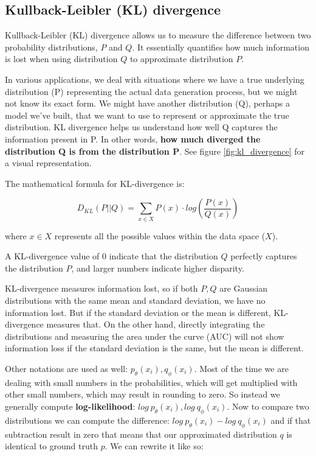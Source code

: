 \subsection{Kullback-Leibler (KL) divergence}
\label{appendix:kl_divergence}



Kullback-Leibler (KL) divergence allows us to measure the difference between two probability distributions, $P$ and $Q$. It essentially quantifies how much information is lost when using distribution $Q$ to approximate distribution $P$.

In various applications, we deal with situations where we have a true underlying distribution (P) representing the actual data generation process, but we might not know its exact form. We might have another distribution (Q), perhaps a model we've built, that we want to use to represent or approximate the true distribution. KL divergence helps us understand how well Q captures the information present in P. In other words, \textbf{how much diverged the distribution Q is from the distribution P}. See figure \ref{fig:kl_divergence} for a visual representation.

The mathematical formula for KL-divergence is:

\begin{equation}
\label{eq:kl-divergence}
    D_{KL}(P || Q) = \sum_{x \in X} P(x) \cdot log(\frac{P(x)}{Q(x)})
\end{equation}

where $x \in X$ represents all the possible values within the data space ($X$).

A KL-divergence value of 0 indicate that the distribution $Q$ perfectly captures the distribution $P$, and larger numbers indicate higher disparity.

KL-divergence measures information lost, so if both $P,Q$ are Gaussian distributions with the same mean and standard deviation, we have no information lost. But if the standard deviation or the mean is different, KL-divergence measures that. On the other hand, directly integrating the distributions and measuring the area under the curve (AUC) will not show information loss if the standard deviation is the same, but the mean is different.


Other notations are used as well: $p_\theta(x_i), q_\phi(x_i)$. Most of the time we are dealing with small numbers in the probabilities, which will get multiplied with other small numbers, which may result in rounding to zero. So instead we generally compute \textbf{log-likelihood}: $log\ p_\theta(x_i), log\ q_\phi(x_i)$. Now to compare two distributions we can compute the difference: $log\ p_\theta(x_i) - log\ q_\phi(x_i)$ and if that subtraction result in zero that means that our approximated distribution $q$ is identical to ground truth $p$. We can rewrite it like so: 

